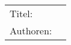 ~\newline
\begin{flushleft}
	\begin{tabular}{lp{11cm}}
		Titel:&  \titel \\ 
		Authoren:&  \autor \\
	\end{tabular} 
\end{flushleft}